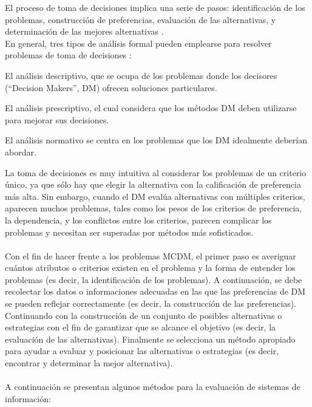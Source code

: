 El proceso de toma de decisiones implica una serie de pasos: identificación de los problemas, construcción de preferencias, evaluación de las alternativas, y determinación de las mejores alternativas \cite[]{simon1977causal, kleindorfer1993decision}.\\
En general, tres tipos de análisis formal pueden emplearse para resolver problemas de toma de decisiones \cite[]{bell1988descriptive, kleindorfer1993decision}:
\\
\begin{viñetas}
\item El análisis descriptivo, que se ocupa de los problemas donde los decisores (``Decision Makers'', DM) ofrecen soluciones particulares.
\item El análisis prescriptivo, el cual considera que los métodos DM deben utilizarse para mejorar sus decisiones.
\item El análisis normativo se centra en los problemas que los DM idealmente deberían abordar.
\\
\end{viñetas}
La toma de decisiones es muy intuitiva al considerar los problemas de un criterio único, ya que sólo hay que elegir la alternativa con la calificación de preferencia más alta. Sin embargo, cuando el DM evalúa alternativas con múltiples criterios, aparecen muchos problemas, tales como los pesos de los criterios de preferencia, la dependencia, y los conflictos entre los criterios, parecen complicar los problemas y necesitan ser superadas por métodos más sofisticados.\\
\\
Con el fin de hacer frente a los problemas MCDM, el primer paso es averiguar cuántos atributos o criterios existen en el problema y la forma de entender los problemas (es decir, la identificación de los problemas). A continuación, se debe recolectar los datos o informaciones adecuadas en las que las preferencias de DM se pueden reflejar correctamente (es decir, la construcción de las preferencias). Continuando con la construcción de un conjunto de posibles alternativas o estrategias con el fin de garantizar que se alcance el objetivo (es decir, la evaluación de las alternativas). Finalmente se selecciona un método apropiado para ayudar a evaluar y posicionar las alternativas o estrategias (es decir, encontrar y determinar la mejor alternativa).\\
\\
A continuación se presentan algunos métodos para la evaluación de sistemas de información: 

